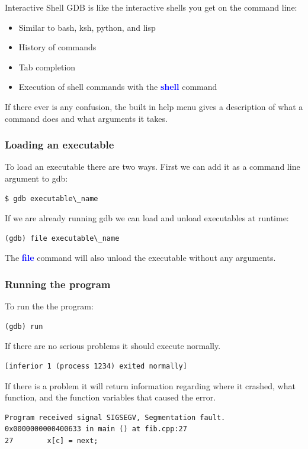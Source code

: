 \documentclass[11pt]{beamer}
\begin{document}
\begin{frame}{Interactive Shell}
        GDB is like the interactive shells you get on the command line:
\begin{itemize}
\item Similar to bash, ksh, python, and lisp
\item History of commands
\item Tab completion
\item Execution of shell commands with the \textbf{\textcolor{blue}{shell}} command
\end{itemize}
If there ever is any confusion, the built in help menu gives a description of what a command does and what arguments it takes.
\end{frame}

\begin{frame}[fragile]
\frametitle{Loading an executable}
To load an executable there are two ways. First we can add it as a command line argument to gdb:
\begin{lstlisting}[style=BashInputStyle]
$ gdb executable\_name
\end{lstlisting}
If we are already running gdb we can load and unload executables at runtime:
\begin{lstlisting}[style=BashInputStyle]
(gdb) file executable\_name
\end{lstlisting}
The \textbf{\textcolor{blue}{file}} command will also unload the executable without any arguments.
\end{frame}

\begin{frame}[fragile]
\frametitle{Running the program}
To run the the program:
\begin{lstlisting}[style=BashInputStyle]
(gdb) run
\end{lstlisting}
If there are no serious problems it should execute normally.
\begin{lstlisting}[style=BashInputStyle]
[inferior 1 (process 1234) exited normally]
\end{lstlisting}
If there is a problem it will return information regarding where it crashed, what function, and the function variables that caused the error.
\begin{lstlisting}[style=BashInputStyle]
Program received signal SIGSEGV, Segmentation fault.
0x0000000000400633 in main () at fib.cpp:27
27        x[c] = next;
\end{lstlisting}
\end{frame}
\end{document}
